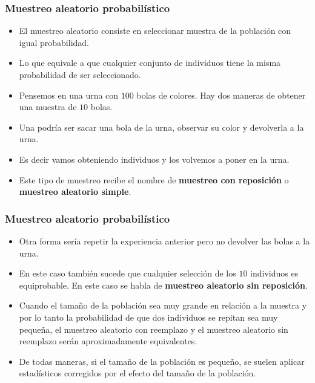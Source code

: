 \begin{frame}
\frametitle{Muestreo aleatorio probabilístico}
\begin{itemize}
\item El muestreo aleatorio consiste en seleccionar muestra de la población con igual probabilidad.
\item Lo que equivale a que cualquier conjunto de individuos tiene la misma probabilidad de ser seleccionado. 
\item Pensemos en una urna con $100$ bolas de colores. Hay dos maneras de obtener una muestra de $10$ bolas.
\item Una podría ser sacar una bola de la urna, observar su color y devolverla a la urna.
\item Es decir vamos obteniendo individuos y los volvemos a poner en la urna. 
\item Este tipo de muestreo recibe el nombre de \textbf{muestreo con reposición} o \textbf{muestreo aleatorio simple}.
\end{itemize}
\end{frame}

\begin{frame}
\frametitle{Muestreo aleatorio probabilístico}
\begin{itemize}
\item Otra forma sería repetir la experiencia anterior pero no devolver las bolas a la urna.
\item  En este caso también sucede que cualquier selección de los $10$ individuos es equiprobable. 
En este caso se habla de \textbf{muestreo aleatorio sin reposición}.
\item Cuando el tamaño de la población sea muy grande en relación a la muestra y por lo tanto la probabilidad de que dos individuos se repitan 
sea muy pequeña, el muestreo aleatorio con reemplazo  y el muestreo aleatorio sin reemplazo serán aproximadamente equivalentes.
\item De todas maneras, si el tamaño de la población es pequeño, se suelen aplicar estadísticos corregidos por el efecto del
tamaño de la población.
\end{itemize}
\end{frame}

